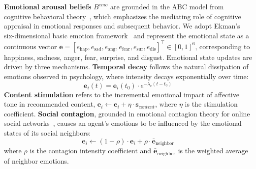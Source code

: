 \documentclass[a4paper,fleqn]{cas-dc}
\begin{document}
\textbf{Emotional arousal beliefs} $B^{emo}$ are grounded in the ABC model from cognitive behavioral theory~\citep{ellis_reason_1962}, which emphasizes the mediating role of cognitive appraisal in emotional responses and subsequent behavior. We adopt Ekman's six-dimensional basic emotion framework~\citep{ekman_basic_1992} and represent the emotional state as a continuous vector $\mathbf{e} = [e_{\text{hap}}, e_{\text{sad}}, e_{\text{ang}}, e_{\text{fear}}, e_{\text{sur}}, e_{\text{dis}}]^\top \in [0,1]^6$, corresponding to happiness, sadness, anger, fear, surprise, and disgust. Emotional state updates are driven by three mechanisms. \textbf{Temporal decay} follows the natural dissipation of emotions observed in psychology, where intensity decays exponentially over time:
\begin{equation}
\mathbf{e}_i(t) = \mathbf{e}_i(t_0) \cdot e^{-\lambda_e(t-t_0)}
\end{equation}
\textbf{Content stimulation} refers to the incremental emotional impact of affective tone in recommended content, $\mathbf{e}_i \leftarrow \mathbf{e}_i + \eta \cdot \mathbf{s}_{content}$, where $\eta$ is the stimulation coefficient. \textbf{Social contagion}, grounded in emotional contagion theory for online social networks~\citep{hatfield_emotional_1994,kramer_experimental_2014,fan2023emotional_contagion}, causes an agent's emotions to be influenced by the emotional states of its social neighbors:
\begin{equation}
\mathbf{e}_i \leftarrow (1-\rho) \cdot \mathbf{e}_i + \rho \cdot \bar{\mathbf{e}}_{\text{neighbor}}
\end{equation}
where $\rho$ is the contagion intensity coefficient and $\bar{\mathbf{e}}_{\text{neighbor}}$ is the weighted average of neighbor emotions.
\end{document}
